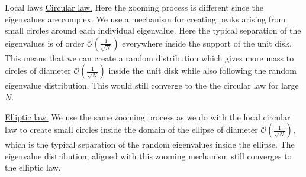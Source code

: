 \documentclass[11pt, a4paper, oneside]{book}
\numberwithin{equation}{chapter}
\begin{document}
\begin{section}{Local laws}
\underline{Circular law.} Here the zooming process is different since the eigenvalues are complex. We use a mechanism for creating peaks arising from small circles around each individual eigenvalue. Here the typical separation of the eigenvalues is of order $\mathcal{O}(\frac{1}{\sqrt{N}})$ everywhere inside the support of the unit disk. This means that we can create a random distribution which gives more mass to circles of diameter $\mathcal{O}(\frac{1}{\sqrt{N}})$ inside the unit disk while also following the random eigenvalue distribution. This would still converge to the the circular law for large $N.$

\underline{Elliptic law.} We use the same zooming process as we do with the local circular law to create small circles inside the domain of the ellipse of diameter $\mathcal{O}(\frac{1}{\sqrt{N}}),$ which is the typical separation of the random eigenvalues inside the ellipse. The eigenvalue distribution, aligned with this zooming mechanism still converges to the elliptic law.
\end{section}
\end{document}
